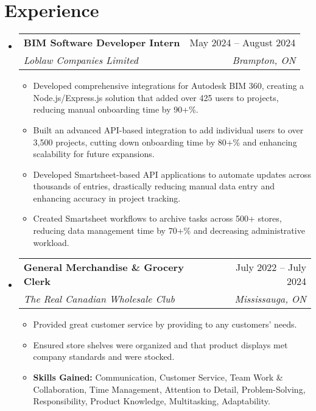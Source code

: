 \documentclass[letterpaper,11pt]{article}
\makeatletter
\newcommand{\resumeItem}[1]{
  \item\small{
    {#1 \vspace{-2pt}}
  }
}
\newcommand{\resumeSubheading}[4]{
  \vspace{-2pt}\item
    \begin{tabular*}{0.97\textwidth}[t]{l@{\extracolsep{\fill}}r}
      \textbf{#1} & #2 \\
      \textit{\small#3} & \textit{\small #4} \\
    \end{tabular*}\vspace{-7pt}
}
\newcommand{\resumeSubHeadingListStart}{\begin{itemize}[leftmargin=0.15in, label={}]}
\newcommand{\resumeSubHeadingListEnd}{\end{itemize}}
\newcommand{\resumeItemListStart}{\begin{itemize}}
\newcommand{\resumeItemListEnd}{\end{itemize}\vspace{-5pt}}
\makeatother
\begin{document}
\section{Experience}
  \resumeSubHeadingListStart
    \resumeSubheading
      {BIM Software Developer Intern}{May 2024 -- August 2024}
      {Loblaw Companies Limited}{Brampton, ON}
      \resumeItemListStart
        \resumeItem{Developed comprehensive integrations for Autodesk BIM 360, creating a Node.js/Express.js solution that added over 425 users to projects, reducing manual onboarding time by 90+\%.}
        \resumeItem{Built an advanced API-based integration to add individual users to over 3,500 projects, cutting down onboarding time by 80+\% and enhancing scalability for future expansions.}
        \resumeItem{Developed Smartsheet-based API applications to automate updates across thousands of entries, drastically reducing manual data entry and enhancing accuracy in project tracking.}
        \resumeItem{Created Smartsheet workflows to archive tasks across 500+ stores, reducing data management time by 70+\% and decreasing administrative workload.}
      \resumeItemListEnd
      \resumeSubheading
      {General Merchandise \& Grocery Clerk}{July 2022 -- July 2024}
      {The Real Canadian Wholesale Club}{Mississauga, ON}
      \resumeItemListStart
        \resumeItem{Provided great customer service by providing to any customers' needs.}
        \resumeItem{Ensured store shelves were organized and that product displays met company standards and were stocked.}
        \resumeItem{\textbf{Skills Gained:} Communication, Customer Service, Team Work \& Collaboration, Time Management, Attention to Detail, Problem-Solving, Responsibility, Product Knowledge, Multitasking, Adaptability.}
      \resumeItemListEnd
  \resumeSubHeadingListEnd

\end{document}
